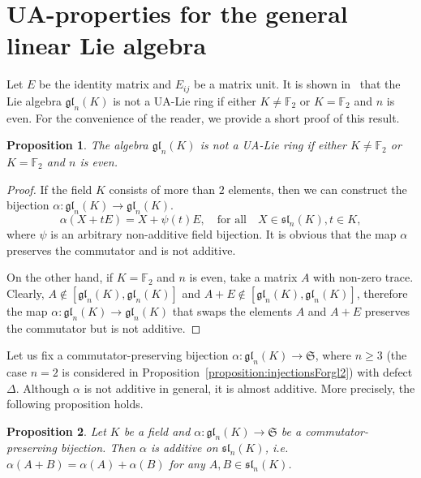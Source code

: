 \documentclass[a4paper,reqno,12pt]{amsart}
\newtheorem{proposition}{Proposition}[section]
\theoremstyle{definition}
\theoremstyle{remark}
\def\FF{{\mathbb F}}
\def\SSS{\mathfrak{S}}
\def\gl{\mathfrak{gl}}
\def\sl{\mathfrak{sl}}
\renewcommand{\ge}{\geqslant}
\begin{document}
	\section{UA-properties for the general linear Lie algebra}
	\label{sec3}

	Let $E$ be the identity matrix and $E_{ij}$ be a matrix unit. It is shown in~\cite[Corollary~2, Remark~2]{arzhantsev2025uniqueness} that the Lie algebra $\gl_n(K)$ is not a UA-Lie ring if either $K \neq \FF_2$ or $K = \FF_2$ and $n$ is even. For the convenience of the reader, we provide a short proof of this result.

	\begin{proposition}\label{proposition:whenglIsNotUA}
		The algebra $\gl_n(K)$ is not a UA-Lie ring if either $K \neq \FF_2$ or $K = \FF_2$ and $n$ is even.
	\end{proposition}

	\begin{proof}
		If the field $K$ consists of more than $2$ elements, then we can construct the bijection $\alpha : \gl_n(K) \rightarrow \gl_n(K)$.
		\begin{equation*}
			\alpha(X + tE) = X + \psi(t)E, \quad \text{for all} \quad X \in \sl_n(K), t \in K,
		\end{equation*}
		where $\psi$ is an arbitrary non-additive field bijection. It is obvious that the map $\alpha$ preserves the commutator and is not additive.

		On the other hand, if $K = \FF_2$ and $n$ is even, take a matrix $A$ with non-zero trace. Clearly, $A \not\in [\gl_n(K), \gl_n(K)]$ and $A + E \not\in [\gl_n(K), \gl_n(K)]$, therefore the map $\alpha : \gl_n(K) \rightarrow \gl_n(K)$ that swaps the elements $A$ and $A + E$ preserves the commutator but is not additive.
	\end{proof}

	Let us fix a commutator-preserving bijection $\alpha : \gl_n(K) \rightarrow \SSS$, where $n \ge 3$ (the case $n = 2$ is considered in Proposition~\ref{proposition:injectionsForgl2}) with defect $\Delta$. Although $\alpha$ is not additive in general, it is almost additive. More precisely, the following proposition holds.

	\begin{proposition}\label{proposition:glIsAlmostUA}
		Let $K$ be a field and $\alpha : \gl_n(K) \rightarrow \SSS$ be a commutator-preserving bijection. Then $\alpha$ is additive on $\sl_n(K)$, i.e. $\alpha(A + B) = \alpha(A) + \alpha(B)$ for any $A, B \in \sl_n(K)$.
	\end{proposition}
\end{document}
